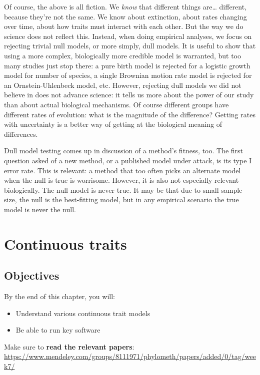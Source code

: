 \documentclass[]{book}
\providecommand{\tightlist}{%
  \setlength{\itemsep}{0pt}\setlength{\parskip}{0pt}}
\theoremstyle{definition}
\theoremstyle{definition}
\theoremstyle{remark}
\begin{document}
Of course, the above is all fiction. We \emph{know} that different
things are\ldots{} different, because they're not the same. We know
about extinction, about rates changing over time, about how traits must
interact with each other. But the way we do science does not reflect
this. Instead, when doing empirical analyses, we focus on rejecting
trivial null models, or more simply, dull models. It is useful to show
that using a more complex, biologically more credible model is
warranted, but too many studies just stop there: a pure birth model is
rejected for a logistic growth model for number of species, a single
Brownian motion rate model is rejected for an Ornstein-Uhlenbeck model,
etc. However, rejecting dull models we did not believe in does not
advance science: it tells us more about the power of our study than
about actual biological mechanisms. Of course different groups have
different rates of evolution: what is the magnitude of the difference?
Getting rates with uncertainty is a better way of getting at the
biological meaning of differences.

Dull model testing comes up in discussion of a method's fitness, too.
The first question asked of a new method, or a published model under
attack, is its type I error rate. This is relevant: a method that too
often picks an alternate model when the null is true is worrisome.
However, it is also not especially relevant biologically. The null model
is never true. It may be that due to small sample size, the null is the
best-fitting model, but in any empirical scenario the true model is
never the null.

\chapter{Continuous traits}\label{continuous-traits}

\section{Objectives}\label{objectives}

By the end of this chapter, you will:

\begin{itemize}
\tightlist
\item
  Understand various continuous trait models
\item
  Be able to run key software
\end{itemize}

Make sure to \textbf{read the relevant papers}:
\url{https://www.mendeley.com/groups/8111971/phylometh/papers/added/0/tag/week7/}
\end{document}
